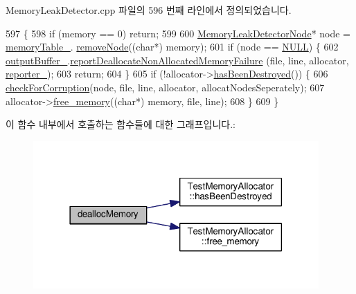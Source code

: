 Memory\+Leak\+Detector.\+cpp 파일의 596 번째 라인에서 정의되었습니다.


\begin{DoxyCode}
597 \{
598     \textcolor{keywordflow}{if} (memory == 0) \textcolor{keywordflow}{return};
599 
600     \hyperlink{struct_memory_leak_detector_node}{MemoryLeakDetectorNode}* node = \hyperlink{class_memory_leak_detector_abee17cabbc59ef23d6f51027208a100c}{memoryTable\_}.
      \hyperlink{struct_memory_leak_detector_table_aaa0452383ce806d8a7248cb567813f84}{removeNode}((\textcolor{keywordtype}{char}*) memory);
601     \textcolor{keywordflow}{if} (node == \hyperlink{openavb__types__base__pub_8h_a070d2ce7b6bb7e5c05602aa8c308d0c4}{NULL}) \{
602         \hyperlink{class_memory_leak_detector_a7d0b175420d83f9ee397b398ae14ac75}{outputBuffer\_}.\hyperlink{class_memory_leak_output_string_buffer_a0061b779a33beb2d8c87eb915b20309a}{reportDeallocateNonAllocatedMemoryFailure}
      (file, line, allocator, \hyperlink{class_memory_leak_detector_a632df6e6476c93d9c58a104a17e155d9}{reporter\_});
603         \textcolor{keywordflow}{return};
604     \}
605     \textcolor{keywordflow}{if} (!allocator->\hyperlink{class_test_memory_allocator_ae26c82159ce24eb59770352585b402fd}{hasBeenDestroyed}()) \{
606         \hyperlink{class_memory_leak_detector_ae260d75b307f341763273c1e99a11c1d}{checkForCorruption}(node, file, line, allocator, allocatNodesSeperately);
607         allocator->\hyperlink{class_test_memory_allocator_a529ac9813d3b0836ce0b964449942534}{free\_memory}((\textcolor{keywordtype}{char}*) memory, file, line);
608     \}
609 \}
\end{DoxyCode}


이 함수 내부에서 호출하는 함수들에 대한 그래프입니다.\+:
\nopagebreak
\begin{figure}[H]
\begin{center}
\leavevmode
\includegraphics[width=309pt]{class_memory_leak_detector_a235bec7842c694f869f6edbf131a6c55_cgraph}
\end{center}
\end{figure}


